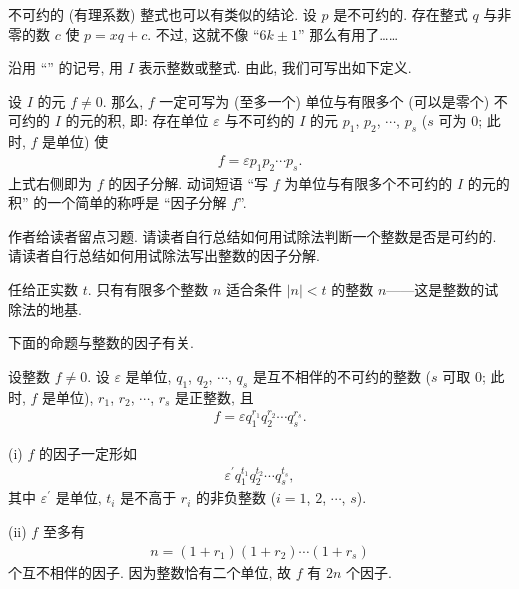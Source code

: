 \begin{remark}
    不可约的 (有理系数) 整式也可以有类似的结论. 设 $p$ 是不可约的. 存在整式 $q$ 与非零的数 $c$ 使 $p = xq + c$. 不过, 这就不像 ``$6k \pm 1$'' 那么有用了……
\end{remark}

沿用 ``'' 的记号, 用 $I$ 表示整数或整式. 由此, 我们可写出如下定义.

\begin{definition}
    设 $I$ 的元 $f \neq 0$. 那么, $f$ 一定可写为 (至多一个) 单位与有限多个 (可以是零个) 不可约的 $I$ 的元的积, 即: 存在单位 $\varepsilon$ 与不可约的 $I$ 的元 $p_1$, $p_2$, $\cdots$, $p_s$ ($s$ 可为 $0$; 此时, $f$ 是单位) 使
    \begin{align*}
        f = \varepsilon p_1 p_2 \cdots p_s.
    \end{align*}
    上式右侧即为 $f$ 的因子分解. 动词短语 ``写 $f$ 为单位与有限多个不可约的 $I$ 的元的积'' 的一个简单的称呼是 ``因子分解 $f$''.
\end{definition}

作者给读者留点习题. 请读者自行总结如何用试除法判断一个整数是否是可约的. 请读者自行总结如何用试除法写出整数的因子分解.

\begin{remark}
    任给正实数 $t$. 只有有限多个整数 $n$ 适合条件 $|n| < t$ 的整数 $n$——这是整数的试除法的地基.
\end{remark}

下面的命题与整数的因子有关.

\begin{proposition}
    设整数 $f \neq 0$. 设 $\varepsilon$ 是单位, $q_1$, $q_2$, $\cdots$, $q_s$ 是互不相伴的不可约的整数 ($s$ 可取 $0$; 此时, $f$ 是单位), $r_1$, $r_2$, $\cdots$, $r_s$ 是正整数, 且
    \begin{align*}
        f = \varepsilon q_1^{r_1} q_2^{r_2} \cdots q_s^{r_s}.
    \end{align*}

    (i) $f$ 的因子一定形如
    \begin{align*}
        \varepsilon^{\prime} q_1^{t_1} q_2^{t_2} \cdots q_s^{t_s},
    \end{align*}
    其中 $\varepsilon^{\prime}$ 是单位, $t_i$ 是不高于 $r_i$ 的非负整数 ($i=1$, $2$, $\cdots$, $s$).

    (ii) $f$ 至多有
    \begin{align*}
        n = (1 + r_1) (1 + r_2) \cdots (1 + r_s)
    \end{align*}
    个互不相伴的因子. 因为整数恰有二个单位, 故 $f$ 有 $2n$ 个因子.
\end{proposition}


